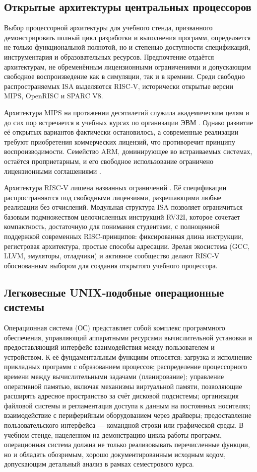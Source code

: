 \subsection{Открытые архитектуры центральных процессоров}

Выбор процессорной архитектуры для учебного стенда, призванного демонстрировать полный цикл разработки и выполнения программ, определяется не только функциональной полнотой, но и степенью доступности спецификаций, инструментария и образовательных ресурсов. Предпочтение отдаётся архитектурам, не обременённым лицензионными ограничениями и допускающим свободное воспроизведение как в симуляции, так и в кремнии. Среди свободно распространяемых ISA выделяются RISC‑V, исторически открытые версии MIPS, OpenRISC и SPARC V8.

Архитектура MIPS на протяжении десятилетий служила академическим целям и до сих пор встречается в учебных курсах по организации ЭВМ \cite{MIPS}. Однако развитие её открытых вариантов фактически остановилось, а современные реализации требуют приобретения коммерческих лицензий, что противоречит принципу воспроизводимости. Семейство ARM, доминирующее во встраиваемых системах, остаётся проприетарным, и его свободное использование ограничено лицензионными соглашениями \cite{ARM}.

Архитектура RISC‑V лишена названных ограничений \cite{RISCV}. Её спецификации распространяются под свободными лицензиями, разрешающими любые реализации без отчислений. Модульная структура ISA позволяет ограничиться базовым подмножеством целочисленных инструкций RV32I, которое сочетает компактность, достаточную для понимания студентами, с полноценной поддержкой современных RISC‑принципов: фиксированная длина инструкции, регистровая архитектура, простые способы адресации. Зрелая экосистема (GCC, LLVM, эмуляторы, отладчики) и активное сообщество делают RISC‑V обоснованным выбором для создания открытого учебного процессора.

\subsection{Легковесные UNIX‑подобные операционные системы}

Операционная система (ОС) представляет собой комплекс программного обеспечения, управляющий аппаратными ресурсами вычислительной установки и предоставляющий интерфейс взаимодействия между пользователем и устройством. К её фундаментальным функциям относятся: загрузка и исполнение прикладных программ с образованием процессов; распределение процессорного времени между вычислительными задачами (планирование); управление оперативной памятью, включая механизмы виртуальной памяти, позволяющие расширять адресное пространство за счёт дисковой подсистемы; организация файловой системы и регламентация доступа к данным на постоянных носителях; взаимодействие с периферийным оборудованием через драйверы; предоставление пользовательского интерфейса — командной строки или графической среды. В учебном стенде, нацеленном на демонстрацию цикла работы программ, операционная система должна не только реализовывать перечисленные функции, но и обладать обозримым, хорошо документированным исходным кодом, допускающим детальный анализ в рамках семестрового курса.

